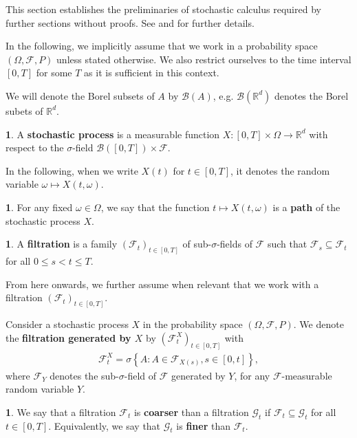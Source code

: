 \documentclass[english]{article}
\numberwithin{equation}{section}
\numberwithin{figure}{section}
\theoremstyle{bolddescit}
\theoremstyle{definition}
\newtheorem{definition}[theorem]{\protect\definitionname}
\theoremstyle{definition}
\theoremstyle{plain}
\theoremstyle{plain}
\theoremstyle{bolddesc}
\theoremstyle{plain}
\theoremstyle{remark}
\providecommand{\definitionname}{Definition}
\begin{document}
This section establishes the preliminaries of stochastic calculus required by further sections without proofs. See \textcite{capinski_stochastic_2012} and \textcite{capinski_blackscholes_2012} for further details.

In the following, we implicitly assume that we work in a probability space $(\Omega, \mathcal{F}, P)$ unless stated otherwise. We also restrict ourselves to the time interval $[0,T]$ for some $T$ as it is sufficient in this context.

We will denote the Borel subsets of $A$ by $\mathcal{B}(A)$, e.g. $\mathcal{B}(\mathbb{R}^d)$ denotes the Borel subets of $\mathbb{R}^d$.

\begin{definition}
  A \textbf{stochastic process} is a measurable function $X : [0,T] \times \Omega \to \mathbb{R}^d$ with respect to the $\sigma$-field $\mathcal{B}([0,T]) \times \mathcal{F}$.
\end{definition}

In the following, when we write $X(t)$ for $t \in [0,T]$, it denotes the random variable $\omega \mapsto X(t, \omega)$.

\begin{definition}
  For any fixed $\omega \in \Omega$, we say that the function $t \mapsto X(t,\omega)$ is a \textbf{path} of the stochastic process $X$.
\end{definition}

\begin{definition}
  A \textbf{filtration} is a family $(\mathcal{F}_t)_{t \in [0,T]}$ of sub-$\sigma$-fields of $\mathcal{F}$ such that $\mathcal{F}_s \subseteq \mathcal{F}_t$ for all $0 \le s < t \le T$.
\end{definition}

From here onwards, we further assume when relevant that we work with a filtration $(\mathcal{F}_t)_{t \in [0,T]}$.

Consider a stochastic process $X$ in the probability space $(\Omega, \mathcal{F}, P)$. We denote the \textbf{filtration generated by $X$} by $(\mathcal{F}^X_t)_{t \in [0,T]}$ with
\begin{align*}
  \mathcal{F}^X_t = \sigma \left\{ A : A \in \mathcal{F}_{X(s)}, s \in [0,t] \right\},
\end{align*}
where $\mathcal{F}_{Y}$ denotes the sub-$\sigma$-field of $\mathcal{F}$ generated by $Y$, for any $\mathcal{F}$-measurable random variable $Y$.

\begin{definition}
  We say that a filtration $\mathcal{F}_t$ is \textbf{coarser} than a filtration $\mathcal{G}_t$ if $\mathcal{F}_t \subseteq \mathcal{G}_t$ for all $t \in [0,T]$. Equivalently, we say that $\mathcal{G}_t$ is \textbf{finer} than $\mathcal{F}_t$.
\end{definition}
\end{document}
